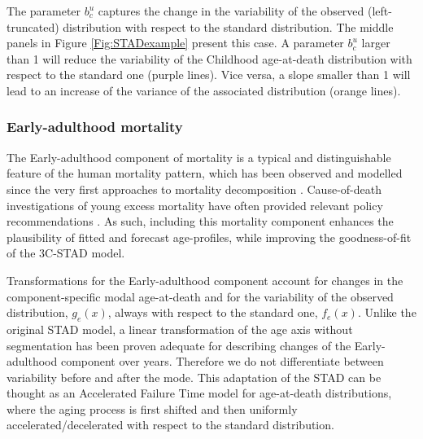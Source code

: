 \documentclass[11pt, a4paper]{article}
\begin{document}
The parameter $b_{c}^{u}$ captures the change in the variability of the observed (left-truncated) distribution with respect to the standard distribution. The middle panels in Figure \ref{Fig:STADexample} present this case. A parameter $b_{c}^{u}$ larger than 1 will reduce the variability of the Childhood age-at-death distribution with respect to the standard one (purple lines). Vice versa, a slope smaller than 1 will lead to an increase of the variance of the associated distribution (orange lines). 

\subsubsection{Early-adulthood mortality}

{\color{red} The Early-adulthood component of mortality is a typical and distinguishable feature of the human mortality pattern, which has been observed and modelled since the very first approaches to mortality decomposition \cite[e.g.~][]{thiele1871mathematical,lexis1878duree,pearson1897chances}. Cause-of-death investigations of young excess mortality have often provided relevant policy recommendations \citep{heuveline2002international,remund2018young}. As such, including this mortality component enhances the plausibility of fitted and forecast age-profiles, while improving the goodness-of-fit of the 3C-STAD model.}

Transformations for the Early-adulthood component account for changes in the component-specific modal age-at-death and for the variability of the observed distribution, $g_{e}(x)$, always with respect to the standard one, $f_{e}(x)$. Unlike the original STAD model, a linear transformation of the age axis without segmentation has been proven adequate for describing changes of the Early-adulthood component over years. Therefore we do not differentiate between variability before and after the mode. This adaptation of the STAD can be thought as an Accelerated Failure Time model for age-at-death distributions, where the aging process is first shifted and then uniformly accelerated/decelerated with respect to the standard distribution. 
\end{document}

